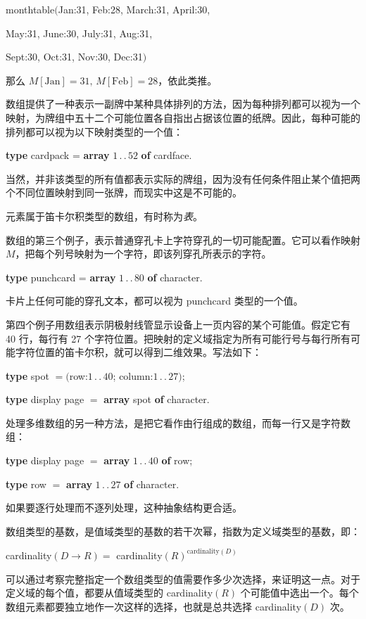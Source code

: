 \documentclass[twoside,11pt,fontset=none]{ctexbook}
\begin{document}
\quad monthtable$($Jan:31, Feb:28, March:31, April:30,

\quad May:31, June:30, July:31, Aug:31,

\quad Sept:30, Oct:31, Nov:30, Dec:31$)$

\noindent
那么 $M[\text{Jan}] = 31,\, M[\text{Feb}] = 28$，依此类推。

数组提供了一种表示一副牌中某种具体排列的方法，因为每种排列都可以视为一个映射，为牌组中五十二个可能位置各自指出占据该位置的纸牌。因此，每种可能的排列都可以视为以下映射类型的一个值：

\quad \textbf{type} cardpack = \textbf{array} $1\,.\,.\,52$ \textbf{of} cardface.

\noindent
当然，并非该类型的所有值都表示实际的牌组，因为没有任何条件阻止某个值把两个不同位置映射到同一张牌，而现实中这是不可能的。

元素属于笛卡尔积类型的数组，有时称为\textit{表}。

数组的第三个例子，表示普通穿孔卡上字符穿孔的一切可能配置。它可以看作映射 $M$，把每个列号映射为一个字符，即该列穿孔所表示的字符。

\quad \textbf{type} punchcard = \textbf{array} $1\,.\,.\,80$ \textbf{of} character.

\noindent
卡片上任何可能的穿孔文本，都可以视为 punchcard 类型的一个值。

第四个例子用数组表示阴极射线管显示设备上一页内容的某个可能值。假定它有 40 行，每行有 27 个字符位置。把映射的定义域指定为所有可能行号与每行所有可能字符位置的笛卡尔积，就可以得到二维效果。写法如下：

\quad \textbf{type} spot $= ($row:$1\,.\,.\,40$; column:$1\,.\,.\,27)$;

\quad \textbf{type} display page $=$ \textbf{array} spot \textbf{of} character.

处理多维数组的另一种方法，是把它看作由行组成的数组，而每一行又是字符数组：

\quad \textbf{type} display page $=$ \textbf{array} $1\,.\,.\,40$ \textbf{of} row;

\quad \textbf{type} row $=$ \textbf{array} $1\,.\,.\,27$ \textbf{of} character.

\noindent
如果要逐行处理而不逐列处理，这种抽象结构更合适。

数组类型的基数，是值域类型的基数的若干次幂，指数为定义域类型的基数，即：

\quad cardinality$(D \rightarrow R) =$ cardinality$(R)^{\text{cardinality}(D)}$

\noindent
可以通过考察完整指定一个数组类型的值需要作多少次选择，来证明这一点。对于定义域的每个值，都要从值域类型的 cardinality$(R)$ 个可能值中选出一个。每个数组元素都要独立地作一次这样的选择，也就是总共选择 cardinality$(D)$ 次。
\end{document}
